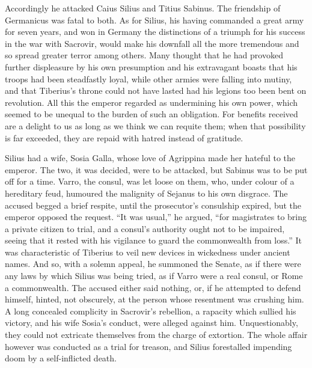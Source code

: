 
Accordingly he attacked Caius Silius and Titius Sabinus. The friendship of Germanicus was fatal to both. As for Silius, his having commanded a great army for seven years, and won in Germany the distinctions of a triumph for his success in the war with Sacrovir, would make his downfall all the more tremendous and so spread greater terror among others. Many thought that he had provoked further displeasure by his own presumption and his extravagant boasts that his troops had been steadfastly loyal, while other armies were falling into mutiny, and that Tiberius's throne could not have lasted had his legions too been bent on revolution. All this the emperor regarded as undermining his own power, which seemed to be unequal to the burden of such an obligation. For benefits received are a delight to us as long as we think we can requite them; when that possibility is far exceeded, they are repaid with hatred instead of gratitude.


Silius had a wife, Sosia Galla, whose love of Agrippina made her hateful to the emperor. The two, it was decided, were to be attacked, but Sabinus was to be put off for a time. Varro, the consul, was let loose on them, who, under colour of a hereditary feud, humoured the malignity of Sejanus to his own disgrace. The accused begged a brief respite, until the prosecutor's consulship expired, but the emperor opposed the request. ``It was usual,'' he argued, ``for magistrates to bring a private citizen to trial, and a consul's authority ought not to be impaired, seeing that it rested with his vigilance to guard the commonwealth from loss.'' It was characteristic of Tiberius to veil new devices in wickedness under ancient names. And so, with a solemn appeal, he summoned the Senate, as if there were any laws by which Silius was being tried, as if Varro were a real consul, or Rome a commonwealth. The accused either said nothing, or, if he attempted to defend himself, hinted, not obscurely, at the person whose resentment was crushing him. A long concealed complicity in Sacrovir's rebellion, a rapacity which sullied his victory, and his wife Sosia's conduct, were alleged against him. Unquestionably, they could not extricate themselves from the charge of extortion. The whole affair however was conducted as a trial for treason, and Silius forestalled impending doom by a self-inflicted death.


